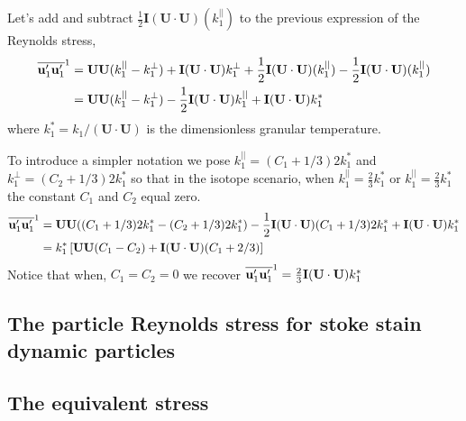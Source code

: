 Let's add and subtract $\frac{1}{2}\textbf{I}(\textbf{U}\cdot\textbf{U})(k^{||}_1)$ to the previous expression of the Reynolds stress, 
\begin{align*}
    \overline{\textbf{u}_1'\textbf{u}_1'}^1
    &= 
    \textbf{U}
    \textbf{U}
    (k^{||}_1 - k^{\bot}_1)
    + \textbf{I} 
    (\textbf{U}\cdot\textbf{U}) k^\bot_1
    + \frac{1}{2}\textbf{I} 
    (\textbf{U}\cdot\textbf{U}) (k^{||}_1)
    - \frac{1}{2}\textbf{I} 
    (\textbf{U}\cdot\textbf{U}) (k^{||}_1)\\
    &= 
    \textbf{U}
    \textbf{U}
    (k^{||}_1 - k^{\bot}_1)
    - \frac{1}{2}\textbf{I} 
    (\textbf{U}\cdot\textbf{U}) k^{||}_1
    + \textbf{I} 
    (\textbf{U}\cdot\textbf{U}) k^*_1
    \\
\end{align*}
where $ k^*_1 = k_1 /(\textbf{U}\cdot \textbf{U})$ is the dimensionless granular temperature.  

To introduce a simpler notation we pose $k^{||}_1 = (C_1 +1/3) 2k_1^*$ and $k^{\bot}_1 = (C_2+1/3) 2k_1^*$ so that in the isotope scenario,  when $k^{||}_1 = \frac{2}{3} k^*_1$ or $k^{||}_1 =\frac{2}{3} k^*_1$ the constant $C_1$ and $C_2$ equal zero. 
\begin{align*}
    \overline{\textbf{u}_1'\textbf{u}_1'}^1
    &= 
    \textbf{U}
    \textbf{U}
    ((C_1 +1/3)2k_1^* -( C_2+1/3) 2 k_1^*)
    - \frac{1}{2}\textbf{I} 
    (\textbf{U}\cdot\textbf{U})  (C_1+1/3) 2k_1^*
    + \textbf{I} 
    (\textbf{U}\cdot\textbf{U}) k^*_1\\
    &= k^*_1 \left[
        \textbf{U}
        \textbf{U}
        (C_1  - C_2 )
        + \textbf{I} 
        (\textbf{U}\cdot\textbf{U})  (C_1+2/3) 
    \right]
\end{align*}
Notice that when, $C_1=C_2= 0$ we recover $\overline{\textbf{u}_1'\textbf{u}_1'}^1=\frac{2}{3} \textbf{I}(\textbf{U}\cdot \textbf{U}) k^*_1$

\subsection{The particle Reynolds stress for stoke stain dynamic particles}
\subsection{The equivalent stress}